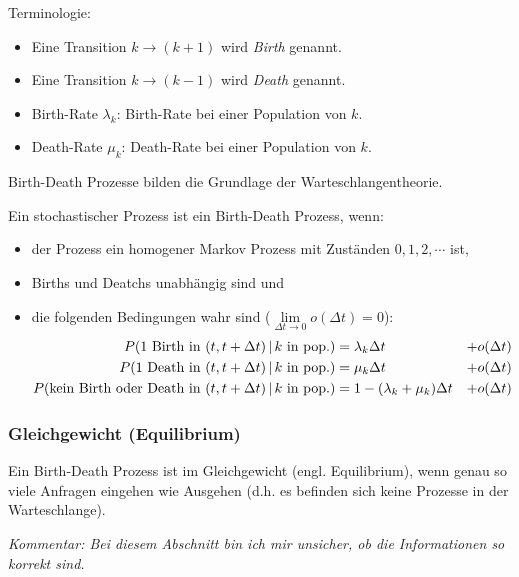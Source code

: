 			Terminologie:
			\begin{itemize}
				\item Eine Transition \( k \rightarrow (k + 1) \) wird \textit{Birth} genannt.
				\item Eine Transition \( k \rightarrow (k - 1) \) wird \textit{Death} genannt.
				\item Birth-Rate \( \lambda _ k \): Birth-Rate bei einer Population von \(k\).
				\item Death-Rate \( \mu _ k \): Death-Rate bei einer Population von \(k\).
			\end{itemize}
			
			Birth-Death Prozesse bilden die Grundlage der Warteschlangentheorie.
			
			Ein stochastischer Prozess ist ein Birth-Death Prozess, wenn:
			\begin{itemize}
				\item der Prozess ein homogener Markov Prozess mit Zuständen \( 0, 1, 2, \cdots \) ist,
				\item Births und Deatchs unabhängig sind und
				\item die folgenden Bedingungen wahr sind (\( \lim\limits _ { \Delta t \to 0 } o(\Delta t) = 0 \)): 
					\begin{align*}
						P(1 \text{ Birth in } (t, t + \Delta t) \,\vert\, k \text{ in pop.})              & = \lambda _ k \Delta t                 & + o(\Delta t) \\
						P(1 \text{ Death in } (t, t + \Delta t) \,\vert\, k \text{ in pop.})              & = \mu _ k \Delta t                     & + o(\Delta t) \\
						P(\text{kein Birth oder Death in } (t, t + \Delta t) \,\vert\, k \text{ in pop.}) & = 1 - (\lambda _ k + \mu _ k) \Delta t & + o(\Delta t)
					\end{align*}
			\end{itemize}
			
			\subsubsection{Gleichgewicht (Equilibrium)} %
				Ein Birth-Death Prozess ist im Gleichgewicht (engl. Equilibrium), wenn genau so viele Anfragen eingehen wie Ausgehen (d.h. es befinden sich keine Prozesse in der Warteschlange).
				
				\textit{Kommentar: Bei diesem Abschnitt bin ich mir unsicher, ob die Informationen so korrekt sind.} 
			

